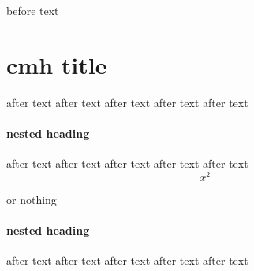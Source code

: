 before text

\section{cmh title}
	after text
	after text
	after text
	after text
	after text
	
	\paragraph{nested heading}
		
		after text
		after text
		after text
		after text
		after text
		\[
			x^2
		\]
		\begin{something}[optional]
			or nothing
		\end{something}
		
	\paragraph{nested heading}
		
		after text
		after text
		after text
		after text
		after text
